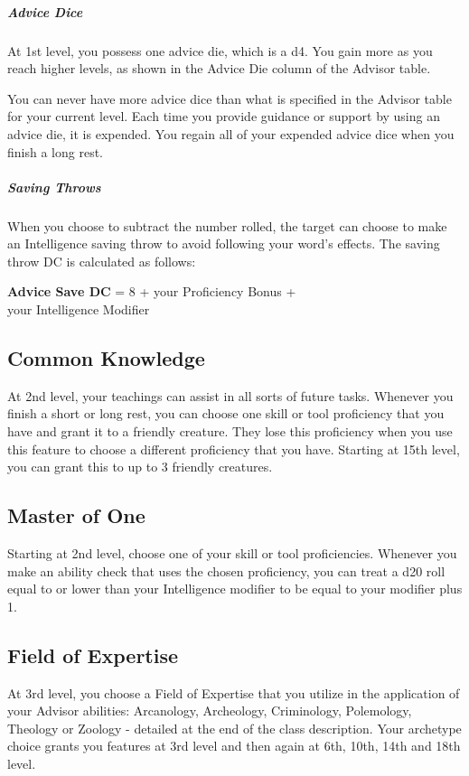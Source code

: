 \documentclass[letterpaper,openany,twoside,twocolumn]{book}
\begin{document}
	\subparagraph*{Advice Dice} At 1st level, you possess one advice die, which is a d4. You gain more as you reach higher levels, as shown in the Advice Die column of the Advisor table.
	
	You can never have more advice dice than what is specified in the Advisor table for your current level. Each time you provide guidance or support by using an advice die, it is expended. You regain all of your expended advice dice when you finish a long rest.
	
	\subparagraph*{Saving Throws} When you choose to subtract the number rolled, the target can choose to make an Intelligence saving throw to avoid following your word’s effects. The saving throw DC is calculated as follows:
	\begin{center}
		\textbf{Advice Save DC} = 8 + your Proficiency Bonus + \\your Intelligence Modifier
	\end{center}
	
	
	\subsection*{Common Knowledge}
	At 2nd level, your teachings can assist in all sorts of future tasks. Whenever you finish a short or long rest, you can choose one skill or tool proficiency that you have and grant it to a friendly creature. They lose this proficiency when you use this feature to choose a different proficiency that you have. Starting at 15th level, you can grant this to up to 3 friendly creatures.
	
	\subsection*{Master of One}
	Starting at 2nd level, choose one of your skill or tool proficiencies. Whenever you make an ability check that uses the chosen proficiency, you can treat a d20 roll equal to or lower than your Intelligence modifier to be equal to your modifier plus 1.
	
	\subsection*{Field of Expertise}
	At 3rd level, you choose a Field of Expertise that you utilize in the application of your Advisor abilities: Arcanology, Archeology, Criminology, Polemology, Theology or Zoology - detailed at the end of the class description. Your archetype choice grants you features at 3rd level and then again at 6th, 10th, 14th and 18th level.
	
\end{document}
